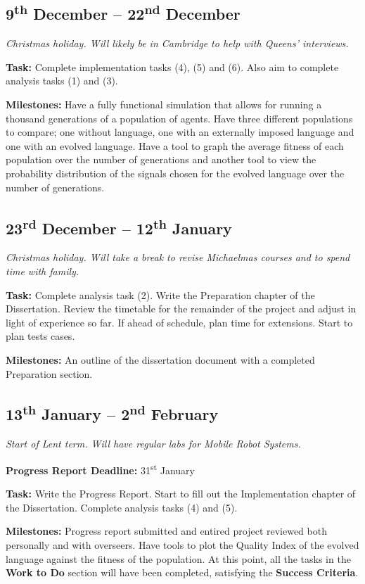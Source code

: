 \documentclass[12pt]{article}
\newcommand{\sups}{\textsuperscript}
\begin{document}
\subsection*{9\sups{th} December -- 22\sups{nd} December}

\emph{Christmas holiday. Will likely be in Cambridge to help with Queens' interviews.}

{\bf Task:} Complete implementation tasks (4), (5) and (6). Also aim to complete analysis tasks (1) and (3).

{\bf Milestones:} Have a fully functional simulation that allows for running a thousand generations of a population of agents. Have three different populations to compare; one without language, one with an externally imposed language and one with an evolved language. Have a tool to graph the average fitness of each population over the number of generations and another tool to view the probability distribution of the signals chosen for the evolved language over the number of generations.

\subsection*{23\sups{rd} December -- 12\sups{th} January}

\emph{Christmas holiday. Will take a break to revise Michaelmas courses and to spend time with family.}

{\bf Task:} Complete analysis task (2). Write the Preparation chapter of the Dissertation. Review the timetable for the remainder of the project and adjust in light of experience so far. If ahead of schedule, plan time for extensions. Start to plan tests cases.

{\bf Milestones:} An outline of the dissertation document with a completed Preparation section.

\subsection*{13\sups{th} January -- 2\sups{nd} February}

\emph{Start of Lent term. Will have regular labs for Mobile Robot Systems.}

{\bf Progress Report Deadline:} 31\sups{st} January

{\bf Task:} Write the Progress Report. Start to fill out the Implementation chapter of the Dissertation. Complete analysis tasks (4) and (5).

{\bf Milestones:} Progress report submitted and entired project reviewed both personally and with overseers. Have tools to plot the Quality Index of the evolved language against the fitness of the population. At this point, all the tasks in the {\bf Work to Do} section will have been completed, satisfying the {\bf Success Criteria}.
\end{document}
